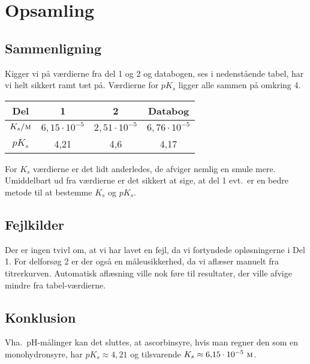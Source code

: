 \section*{Opsamling}
\subsection*{Sammenligning}
Kigger vi på værdierne fra del 1 og 2 og databogen, ses i nedenstående tabel,
har vi helt sikkert ramt tæt på.
Værdierne for $pK_s$ ligger alle sammen på omkring 4.

\begin{table}[h]
    \centering
    \begin{tabular}{|c|c|c|c|}
    \hline

    Del & 1 & 2 & Databog \\ \hline
    $K_s/\textsc{m}$ & $6{,}15 \cdot 10^{-5}$ & $2{,}51 \cdot 10^{-5}$ & $6{,}76 \cdot 10^{-5}$ \\ \hline
    $pK_s$ & 4{,}21 & 4{,}6 & 4{,}17 \\ \hline
    \end{tabular}
\end{table}

For $K_s$ værdierne er det lidt anderledes, de afviger nemlig en smule mere.
Umiddelbart ud fra værdierne er det sikkert at sige, at del 1 evt.~er en bedre metode
til at bestemme $K_s$ og $pK_s$.

\subsection*{Fejlkilder}
Der er ingen tvivl om, at vi har lavet en fejl, da vi fortyndede opløsningerne i Del 1.
For delforsøg 2 er der også en måleusikkerhed, da vi aflæser manuelt fra titrerkurven.
Automatisk aflæsning ville nok føre til resultater, der ville afvige mindre fra tabel-værdierne.

\subsection*{Konklusion}
Vha.~pH-målinger kan det sluttes, at ascorbinsyre, hvis man regner den som en monohydronsyre,
har $pK_s \approx 4{,}21$ og tilsvarende $K_s \approx 6{,}15 \cdot 10^{-5}\ \textsc{m}$.